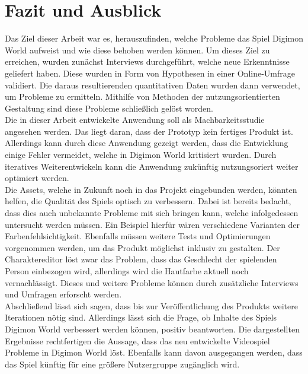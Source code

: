 \section{Fazit und Ausblick}\label{sec:conclusion}
Das Ziel dieser Arbeit war es, herauszufinden, welche Probleme das Spiel Digimon World aufweist und wie diese behoben werden können.
Um dieses Ziel zu erreichen, wurden zunächst Interviews durchgeführt, welche neue Erkenntnisse geliefert haben.
Diese wurden in Form von Hypothesen in einer Online-Umfrage validiert.
Die daraus resultierenden quantitativen Daten wurden dann verwendet, um Probleme zu ermitteln.
Mithilfe von Methoden der nutzungsorientierten Gestaltung sind diese Probleme schließlich gelöst worden.\\

Die in dieser Arbeit entwickelte Anwendung soll als Machbarkeitsstudie angesehen werden.
Das liegt daran, dass der Prototyp kein fertiges Produkt ist.
Allerdings kann durch diese Anwendung gezeigt werden, dass die Entwicklung einige Fehler vermeidet, welche in Digimon World kritisiert wurden. 
Durch iteratives Weiterentwickeln kann die Anwendung zukünftig nutzungsoriert weiter optimiert werden.\\

Die Assets, welche in Zukunft noch in das Projekt eingebunden werden, könnten helfen, die Qualität des Spiels optisch zu verbessern.
Dabei ist bereits bedacht, dass dies auch unbekannte Probleme mit sich bringen kann, welche infolgedessen untersucht werden müssen.
Ein Beispiel hierfür wären verschiedene Varianten der Farbenfehlsichtigkeit.
Ebenfalls müssen weitere Tests und Optimierungen vorgenommen werden, um das Produkt möglichst inklusiv zu gestalten.
Der Charaktereditor löst zwar das Problem, dass das Geschlecht der spielenden Person einbezogen wird, allerdings wird die Hautfarbe aktuell noch vernachlässigt.
Dieses und weitere Probleme können durch zusätzliche Interviews und Umfragen erforscht werden.\\

Abschließend lässt sich sagen, dass bis zur Veröffentlichung des Produkts weitere Iterationen nötig sind.
Allerdings lässt sich die Frage, ob Inhalte des Spiels Digimon World verbessert werden können, positiv beantworten.
Die dargestellten Ergebnisse rechtfertigen die Aussage, dass das neu entwickelte Videospiel Probleme in Digimon World löst.
Ebenfalls kann davon ausgegangen werden, dass das Spiel künftig für eine größere Nutzergruppe zugänglich wird.
